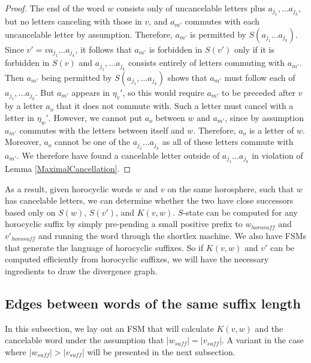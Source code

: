 \documentclass{amsart}
\theoremstyle{definition}
\theoremstyle{remark}
\begin{document}
\begin{proof}
		The end of the word $w$ consists only of uncancelable letters plus $a_{j_1}, ... a_{j_k}$, but no letters canceling with those in $v$, and $a_{m'}$ commutes with each uncancelable letter by assumption. Therefore, $a_{m'}$ is permitted by $S(a_{j_1}...a_{j_k})$. Since $v'=va_{j_1}...a_{j_k}$, it follows that $a_{m'}$ is forbidden in $S(v')$ only if it is forbidden in $S(v)$ and $a_{j_1}, ... a_{j_k}$ consists entirely of letters commuting with $a_{m'}$. Then $a_{m'}$ being permitted by $S(a_{j_1}, ... a_{j_k})$ shows that $a_{m'}$ must follow each of $a_{j_1}, ... a_{j_k}$. But $a_{m'}$ appears in $\eta_v'$, so this would require $a_{m'}$ to be preceded after $v$ by a letter $a_o$ that it does not commute with. Such a letter must cancel with a letter in $\eta_w'$. However, we cannot put $a_o$ between $w$ and $a_{m'}$, since by assumption $a_{m'}$ commutes with the letters between itself and $w$. Therefore, $a_o$ is a letter of $w$. Moreover, $a_o$ cannot be one of the $a_{j_1} ... a_{j_k}$ as all of these letters commute with $a_{m'}$. We therefore have found a cancelable letter outside of $a_{j_1} ... a_{j_k}$ in violation of Lemma \ref{MaximalCancellation}.
        
	\end{proof}
	
	As a result, given horocyclic words $w$ and $v$ on the same horosphere, such that $w$ has cancelable letters, we can determine whether the two have close successors based only on $S(w)$, $S(v')$, and $K(v,w)$. $S$-state can be computed for any horocyclic suffix by simply pre-pending a small positive prefix to $w_{horosuff}$ and $v'_{horosuff}$ and running the word through the shortlex machine. We also have FSMs that generate the language of horocyclic suffixes. So if $K(v,w)$ and $v'$ can be computed efficiently from horocyclic suffixes, we will have the necessary ingredients to draw the divergence graph.
	
	\subsection{Edges between words of the same suffix length}
	\label{subsec:DivergenceEdgesSameLength}
	
	In this subsection, we lay out an FSM that will calculate $K(v,w)$ and the cancelable word under the assumption that $|w_{suff}|=|v_{suff}|$. A variant in the case where $|w_{suff}|>|v_{suff}|$ will be presented in the next subsection.
	
\end{document}
